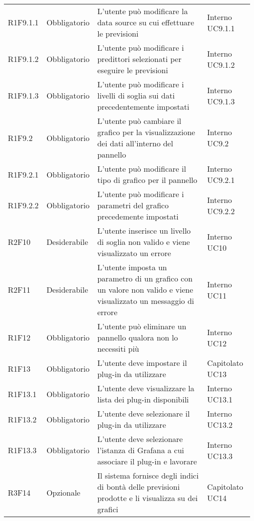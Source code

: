\begin{longtable} {
		>{}p{24mm} 
		>{}p{32mm}
		>{}p{40mm} 
		>{}p{24.5mm}
		}
		R1F9.1.1 & Obbligatorio & L'utente può modificare la data source su cui effettuare le previsioni & Interno UC9.1.1 \TBstrut \\ [2mm]
		R1F9.1.2 & Obbligatorio & L'utente può modificare i predittori selezionati per eseguire le previsioni & Interno UC9.1.2 \TBstrut \\ [2mm]
		R1F9.1.3 & Obbligatorio & L'utente può modificare i livelli di soglia sui dati precedentemente impostati & Interno UC9.1.3 \TBstrut \\ [2mm]
		R1F9.2 & Obbligatorio & L'utente può cambiare il grafico per la visualizzazione dei dati all'interno del pannello & Interno UC9.2 \TBstrut \\ [2mm]
		R1F9.2.1 & Obbligatorio & L'utente può modificare il tipo di grafico per il pannello & Interno UC9.2.1 \TBstrut \\ [2mm]
		R1F9.2.2 & Obbligatorio & L'utente può modificare i parametri del grafico precedemente impostati & Interno UC9.2.2 \TBstrut \\ [2mm]
		R2F10 & Desiderabile & L'utente inserisce un livello di soglia non valido e viene visualizzato un errore & Interno UC10 \TBstrut \\ [2mm]
		R2F11 & Desiderabile & L'utente imposta un parametro di un grafico con un valore non valido e viene visualizzato un messaggio di errore & Interno UC11 \TBstrut \\ [2mm]
		R1F12 & Obbligatorio & L'utente può eliminare un pannello qualora non lo necessiti più & Interno UC12 \TBstrut \\ [2mm]
		R1F13 & Obbligatorio & L'utente deve impostare il plug-in da utilizzare & Capitolato UC13 \TBstrut \\ [2mm]
		R1F13.1 & Obbligatorio & L'utente deve visualizzare la lista dei plug-in disponibili & Interno UC13.1 \TBstrut \\ [2mm]
        R1F13.2 & Obbligatorio & L'utente deve selezionare il plug-in da utilizzare & Interno UC13.2 \TBstrut \\ [2mm]
		R1F13.3 & Obbligatorio & L'utente deve selezionare l'istanza di Grafana a cui associare il plug-in e lavorare & Interno UC13.3 \TBstrut \\ [2mm]
		R3F14 & Opzionale & Il sistema fornisce degli indici di bontà delle previsioni prodotte e li visualizza su dei grafici & Capitolato UC14 \TBstrut \\ [2mm]
	\end{longtable}